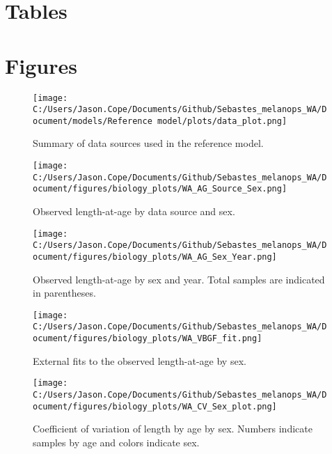 \documentclass[11pt,
  english,
  letterpaper,
]{article}
\begin{document}
\clearpage

\hypertarget{tables}{%
\section{Tables}\label{tables}}





\newpage

\clearpage

\hypertarget{figures}{%
\section{Figures}\label{figures}}

\begin{figure}
\centering
\texttt{[image: C:/Users/Jason.Cope/Documents/Github/Sebastes\_melanops\_WA/Document/models/Reference model/plots/data\_plot.png]}
\caption{Summary of data sources used in the reference model.\label{fig:data-plot}}
\end{figure}

\begin{figure}
\centering
\texttt{[image: C:/Users/Jason.Cope/Documents/Github/Sebastes\_melanops\_WA/Document/figures/biology\_plots/WA\_AG\_Source\_Sex.png]}
\caption{Observed length-at-age by data source and sex.\label{fig:len-age-data-sex}}
\end{figure}

\begin{figure}
\centering
\texttt{[image: C:/Users/Jason.Cope/Documents/Github/Sebastes\_melanops\_WA/Document/figures/biology\_plots/WA\_AG\_Sex\_Year.png]}
\caption{Observed length-at-age by sex and year. Total samples are indicated in parentheses.\label{fig:len-age-sex-year}}
\end{figure}

\begin{figure}
\centering
\texttt{[image: C:/Users/Jason.Cope/Documents/Github/Sebastes\_melanops\_WA/Document/figures/biology\_plots/WA\_VBGF\_fit.png]}
\caption{External fits to the observed length-at-age by sex.\label{fig:len-age-fit}}
\end{figure}

\begin{figure}
\centering
\texttt{[image: C:/Users/Jason.Cope/Documents/Github/Sebastes\_melanops\_WA/Document/figures/biology\_plots/WA\_CV\_Sex\_plot.png]}
\caption{Coefficient of variation of length by age by sex. Numbers indicate samples by age and colors indicate sex.\label{fig:cv-lt-age}}
\end{figure}
\end{document}
